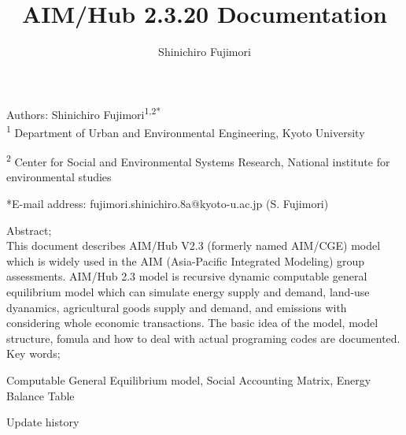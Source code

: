 \documentclass[10pt,a4paper,titlepage,dvipdfmx]{book}
\title{AIM/Hub 2.3.20 Documentation}
\author{Shinichiro Fujimori}
\begin{document}
\maketitle

\begin{flushleft}
Authors: Shinichiro Fujimori\textsuperscript{1,2*} \linebreak\linebreak\linebreak\\

\textsuperscript{1} Department of Urban and Environmental Engineering, Kyoto University


\textsuperscript{2} Center for Social and Environmental Systems Research, National institute for environmental studies


*E-mail address: fujimori.shinichiro.8a@kyoto-u.ac.jp (S. Fujimori)\linebreak\linebreak\linebreak\linebreak

Abstract;
\\
This document describes AIM/Hub V2.3 (formerly named AIM/CGE) model which is widely used in the AIM (Asia-Pacific Integrated Modeling) group assessments. AIM/Hub 2.3 model is recursive dynamic computable general equilibrium model which can simulate energy supply and demand, land-use dyanamics, agricultural goods supply and demand, and emissions with considering whole economic transactions. The basic idea of the model, model structure, fomula and how to deal with actual programing codes are documented.
\linebreak\linebreak\\

Key words;

Computable General Equilibrium model, Social Accounting Matrix, Energy Balance Table
\end{flushleft}

\newpage

{\large Update history}
\end{document}
